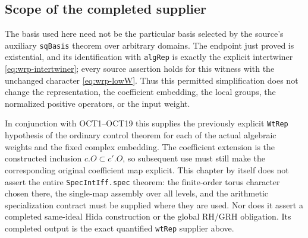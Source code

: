 \subsection{Scope of the completed supplier}

The basis used here need not be the particular basis
selected by the source's auxiliary \texttt{sqBasis}
theorem over arbitrary domains.  The endpoint just
proved is existential, and its identification with
\texttt{algRep} is exactly the explicit intertwiner
\eqref{eq:wrp-intertwiner}; every source assertion holds
for this witness with the unchanged character
\eqref{eq:wrp-lowW}.  Thus this permitted simplification
does not change the representation, the coefficient
embedding, the local groups, the normalized positive
operators, or the input weight.

In conjunction with OCT1--OCT19 this supplies the
previously explicit \texttt{WtRep} hypothesis of the
ordinary control theorem for each of the actual
algebraic weights and the fixed complex embedding.
The coefficient extension is the constructed inclusion
$c.O\subset c'.O$, so subsequent use must still make
the corresponding original coefficient map explicit.
This chapter by itself does not assert the entire
\texttt{SpecIntIff.spec} theorem: the finite-order torus
character chosen there, the single-map assembly over
all levels, and the arithmetic specialization contract
must be supplied where they are used.  Nor does it
assert a completed same-ideal Hida construction or
the global RH/GRH obligation.  Its completed output
is the exact quantified \texttt{wtRep} supplier above.
